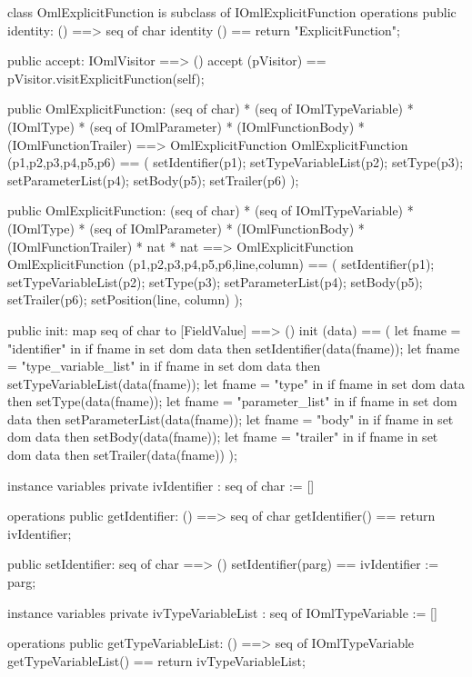 \begin{vdm_al}
class OmlExplicitFunction is subclass of IOmlExplicitFunction
operations
  public identity: () ==> seq of char
  identity () == return "ExplicitFunction";

  public accept: IOmlVisitor ==> ()
  accept (pVisitor) == pVisitor.visitExplicitFunction(self);

  public OmlExplicitFunction:
    (seq of char) *
    (seq of IOmlTypeVariable) *
    (IOmlType) *
    (seq of IOmlParameter) *
    (IOmlFunctionBody) *
    (IOmlFunctionTrailer) ==> OmlExplicitFunction
  OmlExplicitFunction (p1,p2,p3,p4,p5,p6) == 
    ( setIdentifier(p1);
      setTypeVariableList(p2);
      setType(p3);
      setParameterList(p4);
      setBody(p5);
      setTrailer(p6) );

  public OmlExplicitFunction:
    (seq of char) *
    (seq of IOmlTypeVariable) *
    (IOmlType) *
    (seq of IOmlParameter) *
    (IOmlFunctionBody) *
    (IOmlFunctionTrailer) *
    nat *
    nat ==> OmlExplicitFunction
  OmlExplicitFunction (p1,p2,p3,p4,p5,p6,line,column) == 
    ( setIdentifier(p1);
      setTypeVariableList(p2);
      setType(p3);
      setParameterList(p4);
      setBody(p5);
      setTrailer(p6);
      setPosition(line, column) );

  public init: map seq of char to [FieldValue] ==> ()
  init (data) ==
    ( let fname = "identifier" in
        if fname in set dom data
        then setIdentifier(data(fname));
      let fname = "type_variable_list" in
        if fname in set dom data
        then setTypeVariableList(data(fname));
      let fname = "type" in
        if fname in set dom data
        then setType(data(fname));
      let fname = "parameter_list" in
        if fname in set dom data
        then setParameterList(data(fname));
      let fname = "body" in
        if fname in set dom data
        then setBody(data(fname));
      let fname = "trailer" in
        if fname in set dom data
        then setTrailer(data(fname)) );

instance variables
  private ivIdentifier : seq of char := []

operations
  public getIdentifier: () ==> seq of char
  getIdentifier() == return ivIdentifier;

  public setIdentifier: seq of char ==> ()
  setIdentifier(parg) == ivIdentifier := parg;

instance variables
  private ivTypeVariableList : seq of IOmlTypeVariable := []

operations
  public getTypeVariableList: () ==> seq of IOmlTypeVariable
  getTypeVariableList() == return ivTypeVariableList;


\end{vdm_al}
